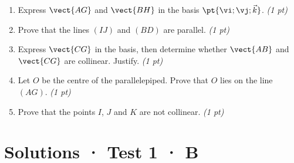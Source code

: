 \begin{enumerate}

\item Express $\vect{AG}$ and $\vect{BH}$ in the basis $\pt{\vi;\vj;\vec k}$. \hfill\textit{(1 pt)}

\item Prove that the lines $(IJ)$ and $(BD)$ are parallel. \hfill\textit{(1 pt)}

\item Express $\vect{CG}$ in the basis, then determine whether $\vect{AB}$ and $\vect{CG}$ are collinear. Justify. \hfill\textit{(1 pt)}

\item Let $O$ be the centre of the parallelepiped. Prove that $O$ lies on the line $(AG)$. \hfill\textit{(1 pt)}

\item Prove that the points $I$, $J$ and $K$ are not collinear. \hfill\textit{(1 pt)}

\end{enumerate}

\ifmxteacher\mxnewpage

\section*{Solutions · Test 1 · B}\label{cor:1-4}

